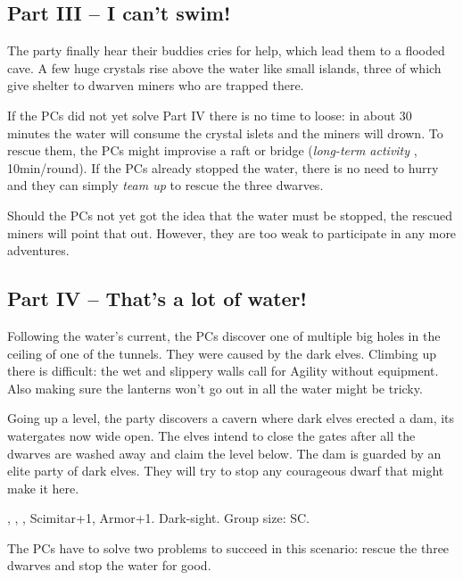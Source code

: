 {		\subsection{Part III -- I can't swim!}

		The party finally hear their buddies cries for help, which lead them to a flooded cave. A few huge crystals rise above the water like small islands, three of which give shelter to dwarven miners who are trapped there.

		If the PCs did not yet solve Part IV there is no time to loose: in about 30 minutes the water will consume the crystal islets and the miners will drown. To rescue them, the PCs might improvise a raft or bridge (\emph{long-term activity} , 10min/round). If the PCs already stopped the water, there is no need to hurry and they can simply \emph{team up}  to rescue the three dwarves.

		Should the PCs not yet got the idea that the water must be stopped, the rescued miners will point that out. However, they are too weak to participate in any more adventures.

		\subsection{Part IV -- That's a lot of water!}

		Following the water's current, the PCs discover one of multiple big holes in the ceiling of one of the tunnels. They were caused by the dark elves. Climbing up there is difficult: the wet and slippery walls call for Agility without equipment. Also making sure the lanterns won't go out in all the water might be tricky.

		Going up a level, the party discovers a cavern where dark elves erected a dam, its watergates now wide open. The elves intend to close the gates after all the dwarves are washed away and claim the level below. The dam is guarded by an elite party of dark elves. They will try to stop any courageous dwarf that might make it here.

		 , , , Scimitar+1, Armor+1. Dark-sight. Group size: SC.


		\noindent
		The PCs have to solve two problems to succeed in this scenario: rescue the three dwarves and stop the water for good.
}
